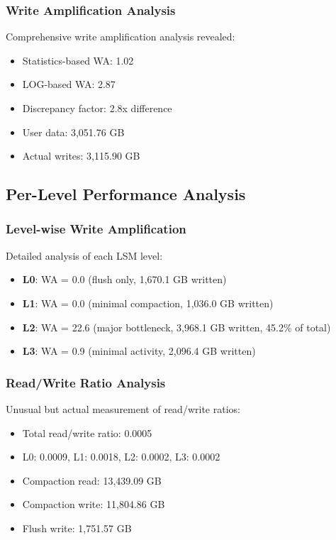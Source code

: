 \documentclass[11pt,twocolumn]{article}
\begin{document}
\subsubsection{Write Amplification Analysis}
Comprehensive write amplification analysis revealed:
\begin{itemize}
    \item Statistics-based WA: 1.02
    \item LOG-based WA: 2.87
    \item Discrepancy factor: 2.8x difference
    \item User data: 3,051.76 GB
    \item Actual writes: 3,115.90 GB
\end{itemize}

\subsection{Per-Level Performance Analysis}

\subsubsection{Level-wise Write Amplification}
Detailed analysis of each LSM level:
\begin{itemize}
    \item \textbf{L0}: WA = 0.0 (flush only, 1,670.1 GB written)
    \item \textbf{L1}: WA = 0.0 (minimal compaction, 1,036.0 GB written)
    \item \textbf{L2}: WA = 22.6 (major bottleneck, 3,968.1 GB written, 45.2\% of total)
    \item \textbf{L3}: WA = 0.9 (minimal activity, 2,096.4 GB written)
\end{itemize}

\subsubsection{Read/Write Ratio Analysis}
Unusual but actual measurement of read/write ratios:
\begin{itemize}
    \item Total read/write ratio: 0.0005
    \item L0: 0.0009, L1: 0.0018, L2: 0.0002, L3: 0.0002
    \item Compaction read: 13,439.09 GB
    \item Compaction write: 11,804.86 GB
    \item Flush write: 1,751.57 GB
\end{itemize}
\end{document}
